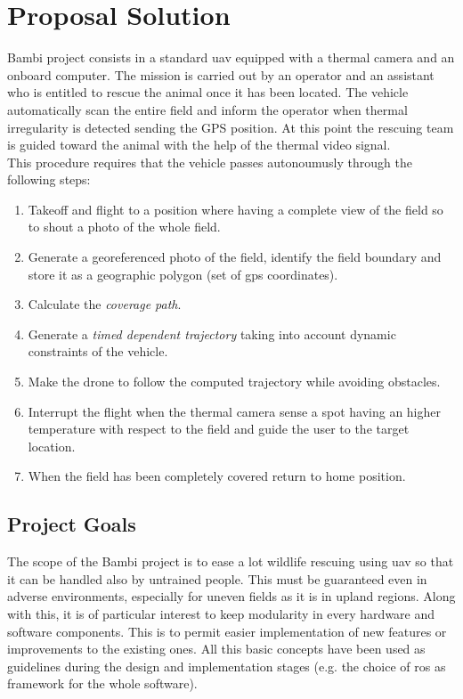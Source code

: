  \section{Proposal Solution} %
 \label{sec:proposal_solution}
 Bambi project consists in a standard \acrshort{uav} equipped with a thermal camera and an onboard computer.
 The mission is carried out by an operator and an assistant who is entitled to rescue the animal once it has been located.
 The vehicle automatically scan the entire field and inform the operator when thermal irregularity is detected sending the GPS position. At this point the rescuing team is guided toward the animal with the help of the thermal video signal. \\
 This procedure requires that the vehicle passes autonoumusly through the following steps:
 \begin{enumerate}
   \item Takeoff and flight to a position where having a complete view of the field so to shout a photo of the whole field.
   \item Generate a georeferenced photo of the field, identify the field boundary and store it as a geographic polygon (set of \acrshort{gps} coordinates).
   \item Calculate the \textit{coverage path}.
   \item Generate a \textit{timed dependent trajectory} taking into account dynamic constraints of the vehicle.
   \item Make the drone to follow the computed trajectory while avoiding obstacles.
   \item Interrupt the flight when the thermal camera sense a spot having an higher temperature with respect to the field and guide the user to the target location.
   \item When the field has been completely covered return to home position.
 \end{enumerate}

 \subsection{Project Goals} %
 \label{sec:bambisaver_goals}
 The scope of the Bambi project is to ease a lot wildlife rescuing using \acrshort{uav} so that it can be handled also by untrained people. This must be guaranteed even in adverse environments, especially for uneven fields as it is in upland regions.
 Along with this, it is of particular interest to keep modularity in every hardware and software components. This is to permit easier implementation of new features or improvements to the existing ones.
 All this basic concepts have been used as guidelines during the design and implementation stages (e.g. the choice of \acrshort{ros} as framework for the whole software).

